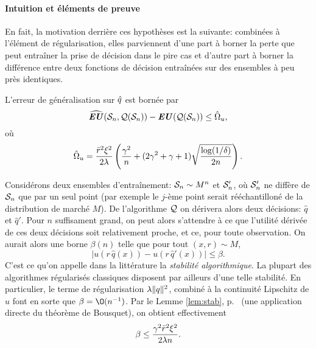 \paragraph{Intuition et éléments de preuve}

En fait, la motivation derrière ces hypothèses est la suivante: combinées à l'élément de
régularisation, elles parviennent d'une part à borner la perte que peut entraîner la prise
de décision dans le pire cas et d'autre part à borner la différence entre deux fonctions
de décision entraînées sur des ensembles à peu près identiques.

\begin{thm}
  L'erreur de généralisation sur $\qh$ est bornée par
  \begin{equation}
  \label{b:borneu1}
  \hEU(\S_n,\alg(\S_n)) - \EU(\alg(\S_n)) \leq \hat \Omega_u,
\end{equation}
où
\begin{equation}
  \label{b:borneu2}
  \hat\Omega_u = \frac{\rmax^2\xi^2}{2\lambda}\left(\frac{\gamma^2}{n} + (2\gamma^2+\gamma+1)\sqrt{\frac{\log(1/\delta)}{2n}}\right).
\end{equation}
\end{thm}

Considérons deux ensembles d'entraînement: $\S_n \sim M^n$ et $\S'_n$, où $\S'_n$ ne diffère
de $\S_n$ que par un seul point (par exemple le $j$-ème point serait rééchantilloné de la
distribution de marché $M$). De l'algorithme $\alg$ on dérivera alors deux décisions:
$\hat q$ et $\hat q'$. Pour $n$ suffisament grand, on peut alors s'attendre à ce que
l'utilité dérivée de ces deux décisions soit relativement proche, et ce, pour toute
observation. On aurait alors une borne $\beta(n)$ telle que pour tout $(x,r) \sim M$,
\begin{equation}
  |u(r\,\hat q(x)) - u(r\,\hat q'(x))| \leq \beta.
\end{equation}
C'est ce qu'on appelle dans la littérature la \textit{stabilité algorithmique}. La plupart
des algorithmes régularisés classiques disposent par ailleurs d'une telle stabilité. En
particulier, le terme de régularisation $\lambda \nq{q}^2$, combiné à la continuité Lipschitz de
$u$ font en sorte que $\beta = \O(n^{-1})$. Par le Lemme \ref{lem:stab}, p.~\pageref{lem:stab}
(une application directe du théorème de Bousquet), on obtient effectivement
\begin{equation}
  \beta \leq \frac{\gamma^2\rmax^2\xi^2}{2\lambda n}.
\end{equation}

